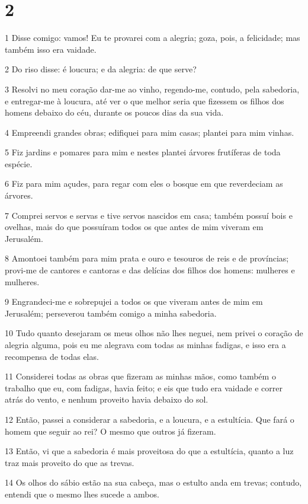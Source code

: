 \chapter{2}

\par 1 Disse comigo: vamos! Eu te provarei com a alegria; goza, pois, a felicidade; mas também isso era vaidade.
\par 2 Do riso disse: é loucura; e da alegria: de que serve?
\par 3 Resolvi no meu coração dar-me ao vinho, regendo-me, contudo, pela sabedoria, e entregar-me à loucura, até ver o que melhor seria que fizessem os filhos dos homens debaixo do céu, durante os poucos dias da sua vida.
\par 4 Empreendi grandes obras; edifiquei para mim casas; plantei para mim vinhas.
\par 5 Fiz jardins e pomares para mim e nestes plantei árvores frutíferas de toda espécie.
\par 6 Fiz para mim açudes, para regar com eles o bosque em que reverdeciam as árvores.
\par 7 Comprei servos e servas e tive servos nascidos em casa; também possuí bois e ovelhas, mais do que possuíram todos os que antes de mim viveram em Jerusalém.
\par 8 Amontoei também para mim prata e ouro e tesouros de reis e de províncias; provi-me de cantores e cantoras e das delícias dos filhos dos homens: mulheres e mulheres.
\par 9 Engrandeci-me e sobrepujei a todos os que viveram antes de mim em Jerusalém; perseverou também comigo a minha sabedoria.
\par 10 Tudo quanto desejaram os meus olhos não lhes neguei, nem privei o coração de alegria alguma, pois eu me alegrava com todas as minhas fadigas, e isso era a recompensa de todas elas.
\par 11 Considerei todas as obras que fizeram as minhas mãos, como também o trabalho que eu, com fadigas, havia feito; e eis que tudo era vaidade e correr atrás do vento, e nenhum proveito havia debaixo do sol.
\par 12 Então, passei a considerar a sabedoria, e a loucura, e a estultícia. Que fará o homem que seguir ao rei? O mesmo que outros já fizeram.
\par 13 Então, vi que a sabedoria é mais proveitosa do que a estultícia, quanto a luz traz mais proveito do que as trevas.
\par 14 Os olhos do sábio estão na sua cabeça, mas o estulto anda em trevas; contudo, entendi que o mesmo lhes sucede a ambos.
